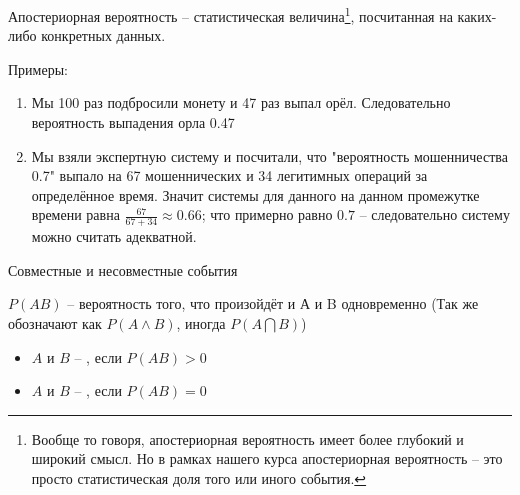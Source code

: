 \begin{frame}{Апостериорная вероятность}
	\small
	 -- статистическая величина\footnote{
		Вообще то говоря, апостериорная вероятность имеет более глубокий и широкий смысл.
		Но в рамках нашего курса апостериорная вероятность -- это просто статистическая доля того или иного события.}, посчитанная на каких-либо конкретных данных.
	
	Примеры: 
	\footnotesize
	\begin{enumerate}
		\item Мы 100 раз подбросили монету и 47 раз выпал орёл. Следовательно 
		вероятность выпадения орла 0.47
		\item Мы взяли экспертную систему и посчитали, что  "вероятность мошенничества 0.7"
		выпало на 67 мошеннических и 34 легитимных операций за определённое время. 
		Значит  системы для данного  на данном промежутке времени равна $\frac{67}{67+34} \approx 0.66$; что примерно равно $0.7$ -- следовательно систему можно считать адекватной.
	\end{enumerate}
\end{frame}




\begin{frame}{Совместные и несовместные события}


$P(AB)$ -- вероятность того, что произойдёт и А и B одновременно
(Так же обозначают как $P(A \wedge B)$, иногда $P(A\bigcap B)$)


\begin{itemize}
	\item $A$ и $B$ -- , если $P(AB) > 0$
	\item $A$ и $B$ -- , если $P(AB) = 0$
\end{itemize}

\end{frame}

